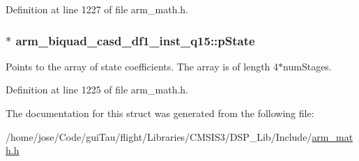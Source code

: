 Definition at line 1227 of file arm\-\_\-math.\-h.

\hypertarget{structarm__biquad__casd__df1__inst__q15_a5481104ef2f8f81360b80b47d69ae932}{
\subsubsection[{p\-State}]{$\ast$ arm\-\_\-biquad\-\_\-casd\-\_\-df1\-\_\-inst\-\_\-q15\-::p\-State}}\label{structarm__biquad__casd__df1__inst__q15_a5481104ef2f8f81360b80b47d69ae932}
Points to the array of state coefficients. The array is of length 4$\ast$num\-Stages. 

Definition at line 1225 of file arm\-\_\-math.\-h.



The documentation for this struct was generated from the following file\-:\begin{DoxyCompactItemize}
\item 
/home/jose/\-Code/gui\-Tau/flight/\-Libraries/\-C\-M\-S\-I\-S3/\-D\-S\-P\-\_\-\-Lib/\-Include/\hyperlink{arm__math_8h}{arm\-\_\-math.\-h}\end{DoxyCompactItemize}

